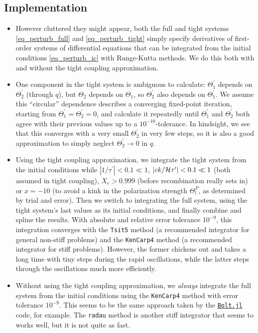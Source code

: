\documentclass[10pt,a4paper]{article}
\begin{document}
\subsection{Implementation}

\begin{itemize}
\item
However cluttered they might appear,
both the full and tight systems \eqref{eq_perturb_full} and \eqref{eq_perturb_tight} simply specify derivatives of first-order systems of differential equations
that can be integrated from the initial conditions \eqref{eq_perturb_ic} with Runge-Kutta methods.
We do this both with and without the tight coupling approximation.

\item
One component in the tight system is ambiguous to calculate:
$\Theta_1^\prime$ depends on $\Theta_2^\prime$ (through $q$),
but $\Theta_2$ depends on $\Theta_1$,
so $\Theta_2^\prime$ also depends on $\Theta_1^\prime$.
We assume this ``circular'' dependence describes a converging fixed-point iteration, starting from $\Theta_1^\prime=\Theta_2^\prime=0$,
and calculate it repeatedly until $\Theta_1^\prime$ and $\Theta_2^\prime$ both agree with their previous values up to a $10^{-10}$-tolerance.
In hindsight, we see that this converges with a very small $\Theta_2^\prime$ in very few steps,
so it is also a good approximation to simply neglect $\Theta_2^\prime \rightarrow 0$ in $q$.

\item
Using the tight coupling approximation,
we integrate the tight system from the initial conditions while
$|1/\tau^\prime| < 0.1 \ll 1$,
$|ck/\mathcal{H}\tau^\prime| < 0.1 \ll 1$ (both assumed in tight coupling),
$X_e > 0.999$ (before recombination really sets in)
or $x = -10$ (to avoid a kink in the polarization strength $\Theta^P_l$, as determined by trial and error).
Then we switch to integrating the full system, using the tight system's last values as its initial conditions, and finally combine and spline the results.
With absolute and relative error tolerance $10^{-9}$,
this integration converges with the \texttt{Tsit5} method (a recommended integrator for general non-stiff problems)
and the \texttt{KenCarp4} method (a recommended integrator for stiff problems).
However, the former chickens out and takes a long time with tiny steps during the rapid oscillations,
while the latter steps through the oscillations much more efficiently.

\item
Without using the tight coupling approximation,
we \textit{always} integrate the full system from the initial conditions using the \texttt{KenCarp4} method with error tolerance $10^{-9}$.
This seems to be the same approach taken by the \texttt{\href{https://github.com/xzackli/Bolt.jl}{Bolt.jl}} code, for example.
The \texttt{radau} method is another stiff integrator that seems to works well, but it is not quite as fast.


\end{itemize}
\end{document}
